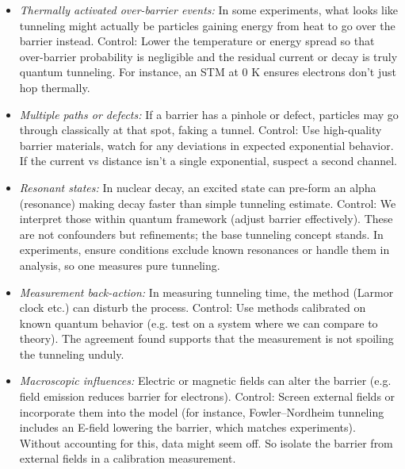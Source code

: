 \documentclass[11pt]{article}
\begin{document}
\begin{itemize}

\item 
\textit{Thermally activated over-barrier events:} In some experiments, what looks like tunneling might actually be particles gaining energy from heat to go over the barrier instead. Control: Lower the temperature or energy spread so that over-barrier probability is negligible and the residual current or decay is truly quantum tunneling. For instance, an STM at 0 K ensures electrons don’t just hop thermally.




\item 
\textit{Multiple paths or defects:} If a barrier has a pinhole or defect, particles may go through classically at that spot, faking a tunnel. Control: Use high-quality barrier materials, watch for any deviations in expected exponential behavior. If the current vs distance isn’t a single exponential, suspect a second channel.




\item 
\textit{Resonant states:} In nuclear decay, an excited state can pre-form an alpha (resonance) making decay faster than simple tunneling estimate. Control: We interpret those within quantum framework (adjust barrier effectively). These are not confounders but refinements; the base tunneling concept stands. In experiments, ensure conditions exclude known resonances or handle them in analysis, so one measures pure tunneling.




\item 
\textit{Measurement back-action:} In measuring tunneling time, the method (Larmor clock etc.) can disturb the process. Control: Use methods calibrated on known quantum behavior (e.g. test on a system where we can compare to theory). The agreement found supports that the measurement is not spoiling the tunneling unduly.




\item 
\textit{Macroscopic influences:} Electric or magnetic fields can alter the barrier (e.g. field emission reduces barrier for electrons). Control: Screen external fields or incorporate them into the model (for instance, Fowler–Nordheim tunneling includes an E-field lowering the barrier, which matches experiments). Without accounting for this, data might seem off. So isolate the barrier from external fields in a calibration measurement.




\end{itemize}
\end{document}
